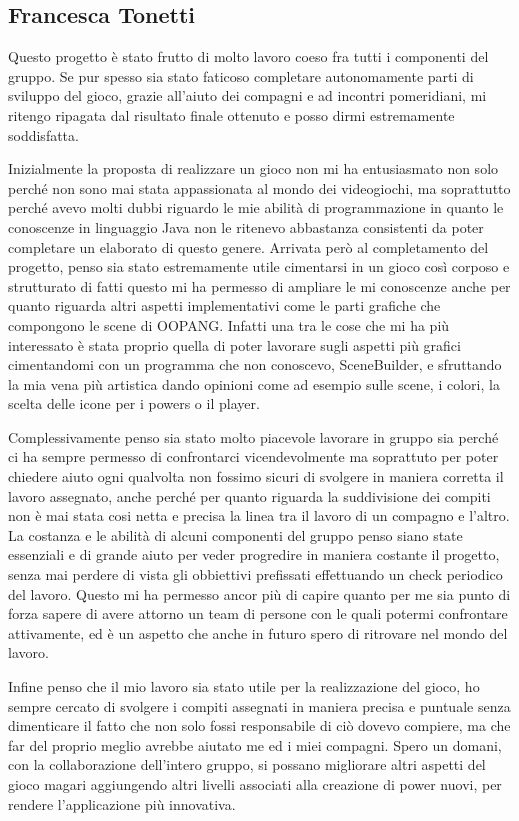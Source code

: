 \documentclass[a4paper,12pt]{report}
\begin{document}
\subsection*{Francesca Tonetti}
Questo progetto è stato frutto di molto lavoro coeso fra tutti i componenti del gruppo.
Se pur spesso sia stato faticoso completare autonomamente parti di sviluppo del gioco, grazie all'aiuto dei compagni e ad incontri pomeridiani, mi ritengo ripagata dal risultato finale ottenuto e posso dirmi estremamente soddisfatta.

Inizialmente la proposta di realizzare un gioco non mi ha entusiasmato non solo perché non sono mai stata appassionata al mondo dei videogiochi, ma soprattutto perché avevo molti dubbi riguardo le mie abilità di programmazione in quanto le conoscenze in linguaggio Java non le ritenevo abbastanza consistenti da poter completare un elaborato di questo genere.
Arrivata però al completamento del progetto, penso sia stato estremamente utile cimentarsi in un gioco così corposo e strutturato di fatti questo mi ha permesso di ampliare le mi conoscenze anche per quanto riguarda altri aspetti implementativi come le parti grafiche che compongono le scene di OOPANG.
Infatti una tra le cose che mi ha più interessato è stata proprio quella di poter lavorare sugli aspetti più grafici cimentandomi con un programma che non conoscevo, SceneBuilder, e sfruttando la mia vena più artistica dando opinioni come ad esempio sulle scene, i colori, la scelta delle icone per i powers o il player.

Complessivamente penso sia stato molto piacevole lavorare in gruppo sia perché ci ha sempre permesso di confrontarci vicendevolmente ma soprattuto per poter chiedere aiuto ogni qualvolta non fossimo sicuri di svolgere in maniera corretta il lavoro assegnato, anche perché per quanto riguarda la suddivisione dei compiti non è mai stata cosi netta e precisa la linea tra il lavoro di un compagno e l'altro.
La costanza e le abilità di alcuni componenti del gruppo penso siano state essenziali e di grande aiuto per veder progredire in maniera costante il progetto, senza mai perdere di vista gli obbiettivi prefissati effettuando un check periodico del lavoro.
Questo mi ha permesso ancor più di capire quanto per me sia punto di forza sapere di avere attorno un team di persone con le quali potermi confrontare attivamente, ed è un aspetto che anche in futuro spero di ritrovare nel mondo del lavoro.

Infine penso che il mio lavoro sia stato utile per la realizzazione del gioco, ho sempre cercato di svolgere i compiti assegnati in maniera precisa e puntuale senza dimenticare il fatto che non solo fossi responsabile di ciò dovevo compiere, ma che far del proprio meglio avrebbe aiutato me ed i miei compagni.
Spero un domani, con la collaborazione dell'intero gruppo, si possano migliorare altri aspetti del gioco magari aggiungendo altri livelli associati alla creazione di power nuovi, per rendere l'applicazione più innovativa.
\end{document}
